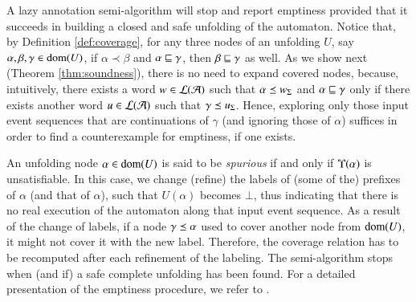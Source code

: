 A lazy annotation semi-algorithm will stop and report emptiness
provided that it succeeds in building a closed and safe unfolding of
the automaton. Notice that, by Definition \ref{def:coverage}, for any
three nodes of an unfolding $U$, say $\alpha,\beta,\gamma \in
\mathrm{dom}(U)$, if $\alpha \prec \beta$ and $\alpha \sqsubseteq \gamma$, then
$\beta \sqsubseteq \gamma$ as well. As we show next (Theorem
\ref{thm:soundness}), there is no need to expand covered nodes,
because, intuitively, there exists a word $w \in {\mathcal L}({\mathcal{A}})$ such that
$\alpha \preceq {w}_\Sigma$ and $\alpha \sqsubseteq \gamma$ only if there
exists another word $u \in {\mathcal L}({\mathcal{A}})$ such that $\gamma \preceq
{u}_\Sigma$. Hence, exploring only those input event sequences that are
continuations of $\gamma$ (and ignoring those of $\alpha$) suffices in
order to find a counterexample for emptiness, if one exists.

An unfolding node $\alpha \in \mathrm{dom}(U)$ is said to be \emph{spurious}
if and only if $\Upsilon({\alpha})$ is unsatisfiable. In this case, we
change (refine) the labels of (some of the) prefixes of $\alpha$ (and
that of $\alpha$), such that $U(\alpha)$ becomes $\bot$, thus
indicating that there is no real execution of the automaton along that
input event sequence. As a result of the change of labels, if a node
$\gamma \preceq \alpha$ used to cover another node from $\mathrm{dom}(U)$, it
might not cover it with the new label. Therefore, the coverage
relation has to be recomputed after each refinement of the
labeling. The semi-algorithm stops when (and if) a safe complete
unfolding has been found. For a detailed presentation of the emptiness
procedure, we refer to \cite{IosifXu18}.

